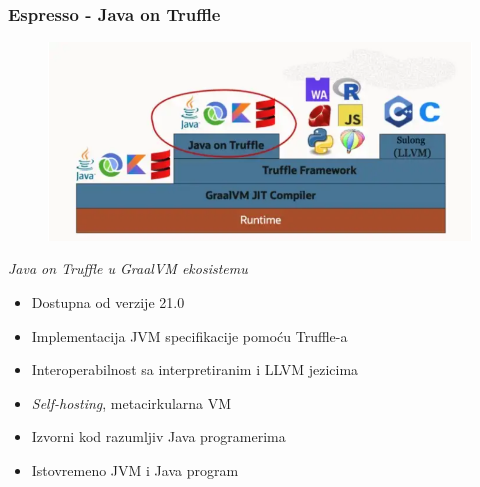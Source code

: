 \documentclass{beamer}
\begin{document}
	\begin{frame}
		\frametitle{Espresso - Java on Truffle}

		\begin{figure}
			\begin{center}
				\includegraphics[width=0.5\linewidth]{imgs/java_on_truffle.png}	
			\end{center} 
		\end{figure}

		\center	
		\textit{Java on Truffle u GraalVM ekosistemu}


		\begin{flushleft}
			\begin{itemize}
				\item Dostupna od verzije 21.0
				\item Implementacija JVM specifikacije pomoću Truffle-a
				\item Interoperabilnost sa interpretiranim i LLVM jezicima
				\item \emph{Self-hosting}, metacirkularna VM
				\item Izvorni kod razumljiv Java programerima
				\item Istovremeno JVM i Java program
			\end{itemize}
		\end{flushleft}

	\end{frame}	
\end{document}
